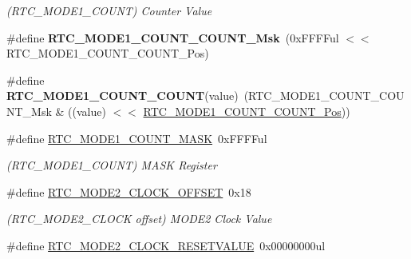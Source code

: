 \begin{DoxyCompactItemize}
\begin{DoxyCompactList}\small\item\em (R\+T\+C\+\_\+\+M\+O\+D\+E1\+\_\+\+C\+O\+U\+N\+T) Counter Value \end{DoxyCompactList}\item 
\hypertarget{group___s_a_m_l21___r_t_c_ga4d12f9096230bde8e80390180ace44de}{}\#define {\bfseries R\+T\+C\+\_\+\+M\+O\+D\+E1\+\_\+\+C\+O\+U\+N\+T\+\_\+\+C\+O\+U\+N\+T\+\_\+\+Msk}~(0x\+F\+F\+F\+Ful $<$$<$ R\+T\+C\+\_\+\+M\+O\+D\+E1\+\_\+\+C\+O\+U\+N\+T\+\_\+\+C\+O\+U\+N\+T\+\_\+\+Pos)\label{group___s_a_m_l21___r_t_c_ga4d12f9096230bde8e80390180ace44de}

\item 
\hypertarget{group___s_a_m_l21___r_t_c_gab5a2564959656d6e973758ad3520d43e}{}\#define {\bfseries R\+T\+C\+\_\+\+M\+O\+D\+E1\+\_\+\+C\+O\+U\+N\+T\+\_\+\+C\+O\+U\+N\+T}(value)~(R\+T\+C\+\_\+\+M\+O\+D\+E1\+\_\+\+C\+O\+U\+N\+T\+\_\+\+C\+O\+U\+N\+T\+\_\+\+Msk \& ((value) $<$$<$ \hyperlink{group___s_a_m_l21___r_t_c_ga63560856c47d39bac19c5935c0341e53}{R\+T\+C\+\_\+\+M\+O\+D\+E1\+\_\+\+C\+O\+U\+N\+T\+\_\+\+C\+O\+U\+N\+T\+\_\+\+Pos}))\label{group___s_a_m_l21___r_t_c_gab5a2564959656d6e973758ad3520d43e}

\item 
\hypertarget{group___s_a_m_l21___r_t_c_ga4a365cf08292a4fa724fdfcdc6d1123f}{}\#define \hyperlink{group___s_a_m_l21___r_t_c_ga4a365cf08292a4fa724fdfcdc6d1123f}{R\+T\+C\+\_\+\+M\+O\+D\+E1\+\_\+\+C\+O\+U\+N\+T\+\_\+\+M\+A\+S\+K}~0x\+F\+F\+F\+Ful\label{group___s_a_m_l21___r_t_c_ga4a365cf08292a4fa724fdfcdc6d1123f}

\begin{DoxyCompactList}\small\item\em (R\+T\+C\+\_\+\+M\+O\+D\+E1\+\_\+\+C\+O\+U\+N\+T) M\+A\+S\+K Register \end{DoxyCompactList}\item 
\hypertarget{group___s_a_m_l21___r_t_c_ga305d0589b1cf934c22f1e43b9065d2dd}{}\#define \hyperlink{group___s_a_m_l21___r_t_c_ga305d0589b1cf934c22f1e43b9065d2dd}{R\+T\+C\+\_\+\+M\+O\+D\+E2\+\_\+\+C\+L\+O\+C\+K\+\_\+\+O\+F\+F\+S\+E\+T}~0x18\label{group___s_a_m_l21___r_t_c_ga305d0589b1cf934c22f1e43b9065d2dd}

\begin{DoxyCompactList}\small\item\em (R\+T\+C\+\_\+\+M\+O\+D\+E2\+\_\+\+C\+L\+O\+C\+K offset) M\+O\+D\+E2 Clock Value \end{DoxyCompactList}\item 
\hypertarget{group___s_a_m_l21___r_t_c_ga2e76e02cd39cc00f06a6be950a5fc260}{}\#define \hyperlink{group___s_a_m_l21___r_t_c_ga2e76e02cd39cc00f06a6be950a5fc260}{R\+T\+C\+\_\+\+M\+O\+D\+E2\+\_\+\+C\+L\+O\+C\+K\+\_\+\+R\+E\+S\+E\+T\+V\+A\+L\+U\+E}~0x00000000ul\label{group___s_a_m_l21___r_t_c_ga2e76e02cd39cc00f06a6be950a5fc260}


\end{DoxyCompactItemize}
